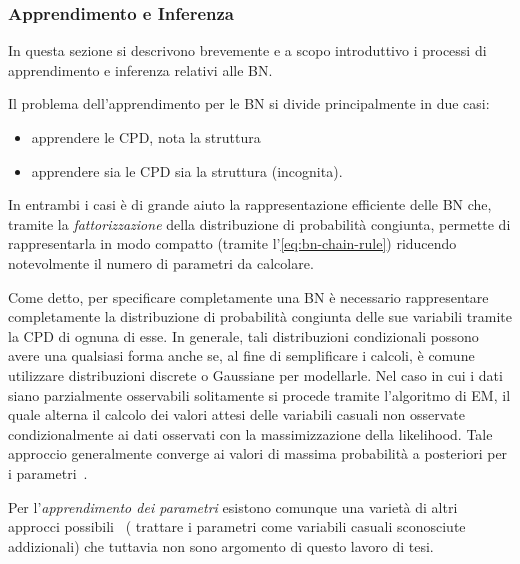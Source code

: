 \subsubsection{Apprendimento e Inferenza}
In questa sezione si descrivono brevemente e a scopo introduttivo i processi di apprendimento e inferenza relativi alle \acl{BN}.

Il problema dell'apprendimento per le \acl{BN} si divide principalmente in due casi:
\begin{itemize}
    \item apprendere le \acs{CPD}, nota la struttura
    \item apprendere sia le \acs{CPD} sia la struttura (incognita).
\end{itemize}
In entrambi i casi è di grande aiuto la rappresentazione efficiente delle \acl{BN} che, tramite la \emph{fattorizzazione} della distribuzione di probabilità congiunta, permette di rappresentarla in modo compatto (tramite l'\autoref{eq:bn-chain-rule}) riducendo notevolmente il numero di parametri da calcolare.

Come detto, per specificare completamente una \acl{BN} è necessario rappresentare completamente la distribuzione di probabilità congiunta delle sue variabili tramite la \acl{CPD} di ognuna di esse. In generale, tali distribuzioni condizionali possono avere una qualsiasi forma anche se, al fine di semplificare i calcoli, è comune utilizzare distribuzioni discrete o Gaussiane per modellarle. Nel caso in cui i dati siano parzialmente osservabili solitamente si procede tramite l'algoritmo di \acf{EM}, il quale alterna il calcolo dei valori attesi delle variabili casuali non osservate condizionalmente ai dati osservati con la massimizzazione della likelihood. Tale approccio generalmente converge ai valori di massima probabilità a posteriori per i parametri~\citep[si veda][]{Dempster1977}.

Per l'\emph{apprendimento dei parametri} esistono comunque una varietà di altri approcci possibili~\citep[si veda][]{Heckerman1996} (\eg{} trattare i parametri come variabili casuali sconosciute addizionali) che tuttavia non sono argomento di questo lavoro di tesi.

